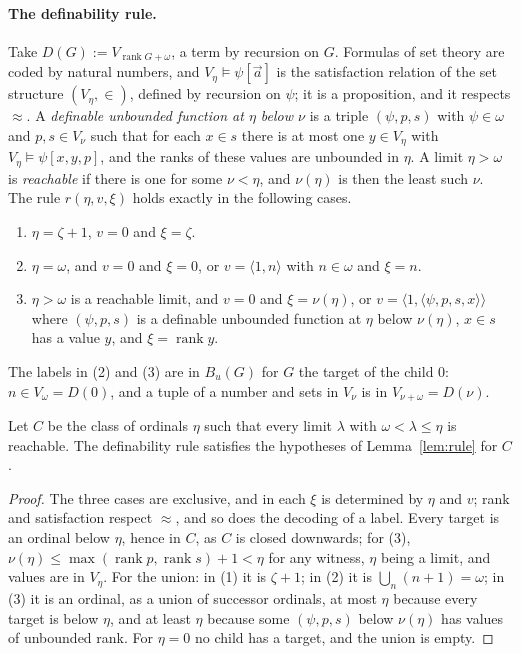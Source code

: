 \documentclass[10pt]{article}
\newcommand{\rk}{\operatorname{rank}}
\begin{document}
\paragraph{The definability rule.}
Take $D(G):=V_{\rk G+\omega}$, a term by recursion on $G$. Formulas of set
theory are coded by natural numbers, and $V_\eta\models\psi[\vec a]$ is the
satisfaction relation of the set structure $(V_\eta,\in)$, defined by
recursion on $\psi$; it is a proposition, and it respects $\approx$. A
\emph{definable unbounded function at $\eta$ below $\nu$} is a triple
$(\psi,p,s)$ with $\psi\in\omega$ and $p,s\in V_\nu$ such that for each $x\in s$
there is at most one $y\in V_\eta$ with $V_\eta\models\psi[x,y,p]$, and the ranks
of these values are unbounded in $\eta$. A limit $\eta>\omega$ is
\emph{reachable} if there is one for some $\nu<\eta$, and $\nu(\eta)$ is then
the least such $\nu$. The rule $r(\eta,v,\xi)$ holds exactly in the following
cases.
\begin{enumerate}
\item $\eta=\zeta+1$, $v=0$ and $\xi=\zeta$.
\item $\eta=\omega$, and $v=0$ and $\xi=0$, or $v=\langle 1,n\rangle$ with $n\in\omega$
  and $\xi=n$.
\item $\eta>\omega$ is a reachable limit, and $v=0$ and $\xi=\nu(\eta)$, or
  $v=\langle 1,\langle\psi,p,s,x\rangle\rangle$ where $(\psi,p,s)$ is a definable
  unbounded function at $\eta$ below $\nu(\eta)$, $x\in s$ has a value $y$, and
  $\xi=\rk y$.
\end{enumerate}
The labels in (2) and (3) are in $B_u(G)$ for $G$ the target of the
child $0$: $n\in V_\omega=D(0)$, and a tuple of a number and sets in
$V_{\nu}$ is in $V_{\nu+\omega}=D(\nu)$.

\begin{lemma}\label{lem:worldlyrule}
Let $C$ be the class of ordinals $\eta$ such that every limit $\lambda$ with
$\omega<\lambda\le\eta$ is reachable. The definability rule satisfies the
hypotheses of Lemma~\ref{lem:rule} for $C$.
\end{lemma}
\begin{proof}
The three cases are exclusive, and in each $\xi$ is determined by $\eta$
and $v$; rank and satisfaction respect $\approx$, and so does the decoding
of a label. Every target is an ordinal below $\eta$, hence in $C$, as $C$ is
closed downwards; for (3), $\nu(\eta)\le\max(\rk p,\rk s)+1<\eta$ for any
witness, $\eta$ being a limit, and values are in $V_\eta$. For the union: in
(1) it is $\zeta+1$; in (2) it is $\bigcup_n(n+1)=\omega$; in (3) it is an
ordinal, as a union of successor ordinals, at most $\eta$ because every
target is below $\eta$, and at least $\eta$ because some $(\psi,p,s)$ below
$\nu(\eta)$ has values of unbounded rank. For $\eta=0$ no child has a
target, and the union is empty.
\end{proof}
\end{document}
